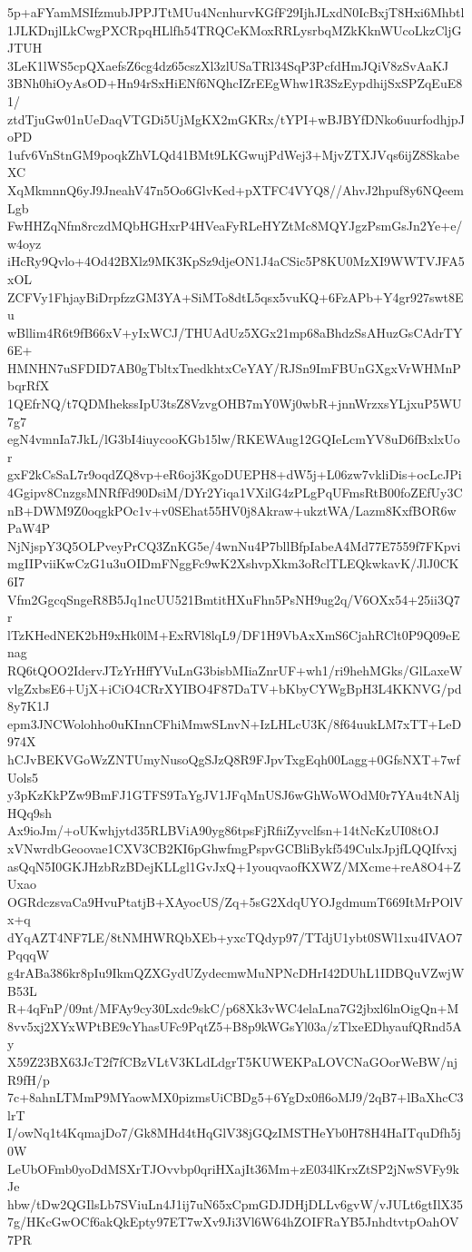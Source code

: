 5p+aFYamMSIfzmubJPPJTtMUu4NcnhurvKGfF29IjhJLxdN0IcBxjT8Hxi6Mhbtl
1JLKDnjlLkCwgPXCRpqHLlfh54TRQCeKMoxRRLysrbqMZkKknWUcoLkzCljGJTUH
3LeK1lWS5cpQXaefsZ6cg4dz65cszXl3zlUSaTRl34SqP3PcfdHmJQiV8zSvAaKJ
3BNh0hiOyAsOD+Hn94rSxHiENf6NQhcIZrEEgWhw1R3SzEypdhijSxSPZqEuE81/
ztdTjuGw01nUeDaqVTGDi5UjMgKX2mGKRx/tYPI+wBJBYfDNko6uurfodhjpJoPD
1ufv6VnStnGM9poqkZhVLQd41BMt9LKGwujPdWej3+MjvZTXJVqs6ijZ8SkabeXC
XqMkmnnQ6yJ9JneahV47n5Oo6GlvKed+pXTFC4VYQ8//AhvJ2hpuf8y6NQeemLgb
FwHHZqNfm8rczdMQbHGHxrP4HVeaFyRLeHYZtMc8MQYJgzPsmGsJn2Ye+e/w4oyz
iHcRy9Qvlo+4Od42BXlz9MK3KpSz9djeON1J4aCSic5P8KU0MzXI9WWTVJFA5xOL
ZCFVy1FhjayBiDrpfzzGM3YA+SiMTo8dtL5qsx5vuKQ+6FzAPb+Y4gr927swt8Eu
wBllim4R6t9fB66xV+yIxWCJ/THUAdUz5XGx21mp68aBhdzSsAHuzGsCAdrTY6E+
HMNHN7uSFDID7AB0gTbltxTnedkhtxCeYAY/RJSn9ImFBUnGXgxVrWHMnPbqrRfX
1QEfrNQ/t7QDMhekssIpU3tsZ8VzvgOHB7mY0Wj0wbR+jnnWrzxsYLjxuP5WU7g7
egN4vmnIa7JkL/lG3bI4iuycooKGb15lw/RKEWAug12GQIeLcmYV8uD6fBxlxUor
gxF2kCsSaL7r9oqdZQ8vp+eR6oj3KgoDUEPH8+dW5j+L06zw7vkliDis+ocLcJPi
4Ggipv8CnzgsMNRfFd90DsiM/DYr2Yiqa1VXilG4zPLgPqUFmsRtB00foZEfUy3C
nB+DWM9Z0oqgkPOc1v+v0SEhat55HV0j8Akraw+ukztWA/Lazm8KxfBOR6wPaW4P
NjNjspY3Q5OLPveyPrCQ3ZnKG5e/4wnNu4P7bllBfpIabeA4Md77E7559f7FKpvi
mgIIPviiKwCzG1u3uOIDmFNggFc9wK2XshvpXkm3oRclTLEQkwkavK/JlJ0CK6I7
Vfm2GgcqSngeR8B5Jq1ncUU521BmtitHXuFhn5PsNH9ug2q/V6OXx54+25ii3Q7r
lTzKHedNEK2bH9xHk0lM+ExRVl8lqL9/DF1H9VbAxXmS6CjahRClt0P9Q09eEnag
RQ6tQOO2IdervJTzYrHffYVuLnG3bisbMIiaZnrUF+wh1/ri9hehMGks/GlLaxeW
vlgZxbsE6+UjX+iCiO4CRrXYIBO4F87DaTV+bKbyCYWgBpH3L4KKNVG/pd8y7K1J
epm3JNCWolohho0uKInnCFhiMmwSLnvN+IzLHLcU3K/8f64uukLM7xTT+LeD974X
hCJvBEKVGoWzZNTUmyNusoQgSJzQ8R9FJpvTxgEqh00Lagg+0GfsNXT+7wfUols5
y3pKzKkPZw9BmFJ1GTFS9TaYgJV1JFqMnUSJ6wGhWoWOdM0r7YAu4tNAljHQq9sh
Ax9ioJm/+oUKwhjytd35RLBViA90yg86tpsFjRfiiZyvclfsn+14tNcKzUI08tOJ
xVNwrdbGeoovae1CXV3CB2KI6pGhwfmgPspvGCBliBykf549CulxJpjfLQQIfvxj
asQqN5I0GKJHzbRzBDejKLLgl1GvJxQ+1youqvaofKXWZ/MXcme+reA8O4+ZUxao
OGRdczsvaCa9HvuPtatjB+XAyocUS/Zq+5sG2XdqUYOJgdmumT669ItMrPOlVx+q
dYqAZT4NF7LE/8tNMHWRQbXEb+yxcTQdyp97/TTdjU1ybt0SWl1xu4IVAO7PqqqW
g4rABa386kr8pIu9IkmQZXGydUZydecmwMuNPNcDHrI42DUhL1IDBQuVZwjWB53L
R+4qFnP/09nt/MFAy9cy30Lxdc9skC/p68Xk3vWC4elaLna7G2jbxl6lnOigQn+M
8vv5xj2XYxWPtBE9cYhasUFc9PqtZ5+B8p9kWGsYl03a/zTlxeEDhyaufQRnd5Ay
X59Z23BX63JcT2f7fCBzVLtV3KLdLdgrT5KUWEKPaLOVCNaGOorWeBW/njR9fH/p
7c+8ahnLTMmP9MYaowMX0pizmsUiCBDg5+6YgDx0fl6oMJ9/2qB7+lBaXhcC3lrT
I/owNq1t4KqmajDo7/Gk8MHd4tHqGlV38jGQzIMSTHeYb0H78H4HaITquDfh5j0W
LeUbOFmb0yoDdMSXrTJOvvbp0qriHXajIt36Mm+zE034lKrxZtSP2jNwSVFy9kJe
hbw/tDw2QGIlsLb7SViuLn4J1ij7uN65xCpmGDJDHjDLLv6gvW/vJULt6gtIlX35
7g/HKcGwOCf6akQkEpty97ET7wXv9Ji3Vl6W64hZOIFRaYB5JnhdtvtpOahOV7PR
